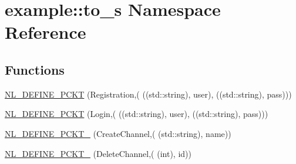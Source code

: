\hypertarget{namespaceexample_1_1to__s}{}\section{example\+:\+:to\+\_\+s Namespace Reference}
\label{namespaceexample_1_1to__s}
\subsection*{Functions}
\begin{DoxyCompactItemize}
\item 
\hyperlink{namespaceexample_1_1to__s_ac90e4002b4bbdae9f36a0614fe263e45}{N\+L\+\_\+\+D\+E\+F\+I\+N\+E\+\_\+\+P\+C\+K\+T} (Registration,(                                                                                                                                           
                                                                                                   ((std\+::string), user),                                                                                                   ((std\+::string), pass)))
\item 
\hyperlink{namespaceexample_1_1to__s_a404f95a3f92f77d9e8f551037c0d7271}{N\+L\+\_\+\+D\+E\+F\+I\+N\+E\+\_\+\+P\+C\+K\+T} (Login,(                                                                                                                                           
                                                                                                   ((std\+::string), user),                                                                                                   ((std\+::string), pass)))
\item 
\hyperlink{namespaceexample_1_1to__s_ad3d5b87cae0b8c1449fd84757093c9af}{N\+L\+\_\+\+D\+E\+F\+I\+N\+E\+\_\+\+P\+C\+K\+T\+\_} (Create\+Channel,(                                                                                                                                           
                                                                                                           (std\+::string), name))
\item 
\hyperlink{namespaceexample_1_1to__s_ae2441a21a7d9463f7df856b33dca60ab}{N\+L\+\_\+\+D\+E\+F\+I\+N\+E\+\_\+\+P\+C\+K\+T\+\_} (Delete\+Channel,(                                                                                                   
                                                                                                           (int), id))
\item 

\end{DoxyCompactItemize}
